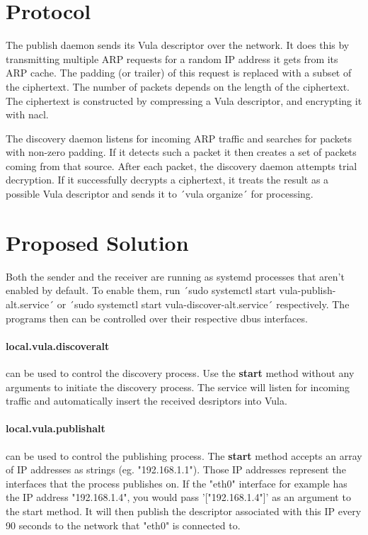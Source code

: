 \documentclass[a4paper,11pt]{report}
\begin{document}
\chapter{Protocol}
The publish daemon sends its Vula descriptor over the network. It does this by transmitting multiple ARP requests for a random IP address it gets from its ARP cache. The padding (or trailer) of this request is replaced with a subset of the ciphertext. The number of packets depends on the length of the ciphertext. The ciphertext is constructed by compressing a Vula descriptor, and encrypting it with nacl.

The discovery daemon listens for incoming ARP traffic and searches for packets with non-zero padding. If it detects such a packet it then creates a set of packets coming from that source. After each packet, the discovery daemon attempts trial decryption. If it successfully decrypts a ciphertext, it treats the result as a possible Vula descriptor and sends it to ´vula organize´ for processing.

\chapter{Proposed Solution}
Both the sender and the receiver are running as systemd processes that aren't enabled by default. To enable them, run ´sudo systemctl start vula-publish-alt.service´ or ´sudo systemctl start vula-discover-alt.service´ respectively. The programs then can be controlled over their respective dbus interfaces.

\subsubsection{local.vula.discoveralt} can be used to control the discovery process. Use the \textbf{start} method without any arguments to initiate the discovery process. The service will listen for incoming traffic and automatically insert the received desriptors into Vula.


\subsubsection{local.vula.publishalt} can be used to control the publishing process. The \textbf{start} method accepts an array of IP addresses as strings (eg. "192.168.1.1"). Those IP addresses represent the interfaces that the process publishes on.
If the "eth0" interface for example has the IP address "192.168.1.4", you would pass '["192.168.1.4"]' as an argument to the start method. 
It will then publish the descriptor associated with this IP every 90 seconds to the network that "eth0" is connected to.
\end{document}
